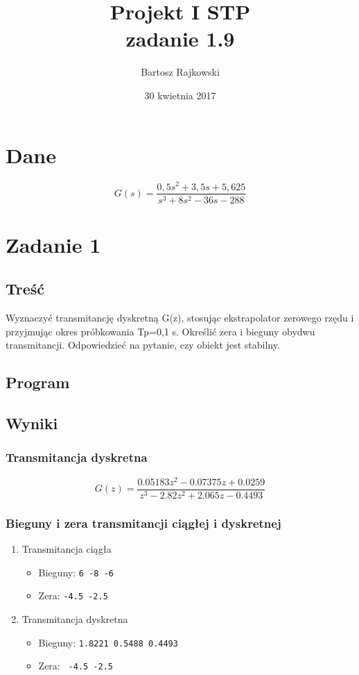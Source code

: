 \documentclass{article}
\author{Bartosz Rajkowski}
\title{Projekt I STP\\zadanie 1.9}
\date{30 kwietnia 2017}
\begin{document}
\maketitle
\newpage
\tableofcontents
\newpage
\section*{Dane}
$$
G(s)=\frac{0,5s^2+3,5s+5,625}{s^3+8s^2-36s-288}
$$
\section{Zadanie 1}
\subsection{Treść}

Wyznaczyć transmitancję dyskretną G(z), stosując ekstrapolator zerowego rzędu i przyjmując okres próbkowania Tp=0,1 s. Określić zera i bieguny obydwu transmitancji. Odpowiedzieć na pytanie, czy obiekt jest stabilny.

\subsection{Program}

\subsection{Wyniki}
\subsubsection{Transmitancja dyskretna}
$$
G(z)=\frac{0.05183 z^2 - 0.07375 z + 0.0259}{z^3 - 2.82 z^2 + 2.065 z - 0.4493}
$$
\subsubsection[Bieguny i zera]{Bieguny i zera transmitancji ciągłej i dyskretnej}
\begin{enumerate}
\item Transmitancja ciągła
\begin{itemize}
\item Bieguny: \verb+6 -8 -6+
\item Zera: \verb+-4.5 -2.5+
\end{itemize}

\item Transmitancja dyskretna
\begin{itemize}
\item Bieguny: \verb+1.8221 0.5488 0.4493+
\item Zera: \verb+ -4.5 -2.5+
\end{itemize}
\end{enumerate}
\end{document}
